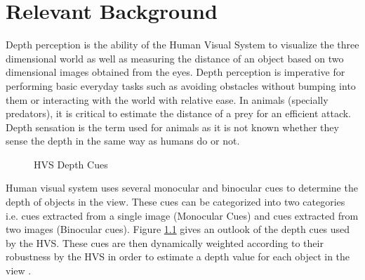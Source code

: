 \chapter{Relevant Background}
\label{chap:reletiveBackground}

Depth perception is the ability of the Human Visual System  to visualize the three dimensional world as well as measuring the distance of an object based on two dimensional images obtained from the eyes. Depth perception is imperative for performing basic everyday tasks such as avoiding obstacles without bumping into them or interacting with the world with relative ease. In animals (specially predators), it is critical to estimate the distance of a prey for an efficient attack. Depth sensation is the term used for animals as it is not known whether they sense the depth in the same way as humans do or not\cite{ wiki:depth_perception}.

\begin{figure}
\caption{HVS Depth Cues\label{fig:CueTree}}
\end{figure}

Human visual system  uses several monocular and binocular cues to determine the depth of objects in the view. These cues can be categorized into two categories i.e. cues extracted from a single image (Monocular Cues) and cues extracted from two images (Binocular cues)\cite{depthcues1}\cite{ wiki:depth_perception}. Figure \ref{fig:CueTree} gives an outlook of the depth cues used by the HVS. These cues are then dynamically weighted according to their robustness by the HVS in order to estimate a depth value for each object in the view \cite{CueFusion}.


